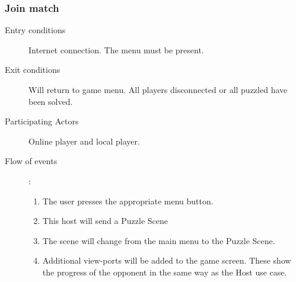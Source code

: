 \documentclass[12pt]{article}
\begin{document}
\begin{mdframed}
    \subsubsection{Join match}
    \begin{description}
        \item[Entry conditions] Internet connection. The menu must be present.
        \item[Exit conditions] Will return to game menu. All players
            disconnected or all puzzled have been solved.
        \item[Participating Actors] Online player and local player.
        \item[Flow of events]:
            \begin{enumerate}
                \item The user presses the appropriate menu button.
                \item This host will send a Puzzle Scene
                \item The scene will change from the main menu to the Puzzle
                    Scene.
                \item Additional view-ports will be added to the game screen.
                These show the progress of the opponent in the same way as
                the Host use case.
            \end{enumerate}
    \end{description}
\end{mdframed}
\end{document}
